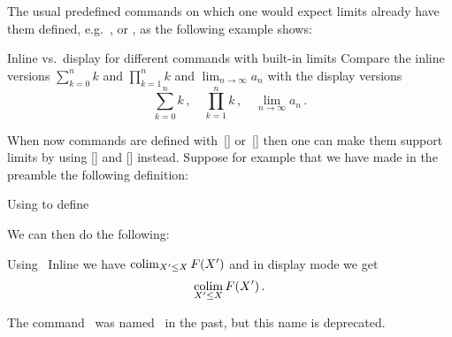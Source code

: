 The usual predefined commands on which one would expect limits already have them defined, e.g.\ ,  or , as the following example shows:
\begin{showlatex}{Inline vs.\ display for different commands with built-in limits}
Compare the inline versions $\sum_{k=0}^n k$ and $\prod_{k=1}^n k$ and $\lim_{n \to \infty} a_n$ with the display versions
\[
  \sum_{k=0}^n k \,,
  \quad
  \prod_{k=1}^n k \,,
  \quad
  \lim_{n \to \infty} a_n \,.
\]
\end{showlatex}
When now commands are defined with~[\comname] or~[\comname] then one can make them support limits by using [\comname] and [\comname] instead.
Suppose for example that we have made in the preamble the following definition:
\begin{showcode}{Using  to define~}
\DeclareMathOperator*{\colim}{colim}
\end{showcode}
We can then do the following:
\begin{showlatex}{Using~}
Inline we have $\colim_{X' \leq X} F(X')$ and in display mode we get
\[
  \colim_{X' \leq X} F(X') \,.
\]
\end{showlatex}
The command~ was named~ in the past, but this name is deprecated.




